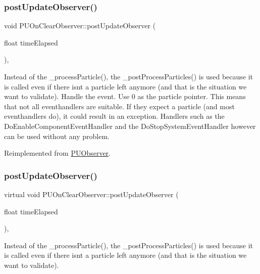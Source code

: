 \subsubsection{\texorpdfstring{post\+Update\+Observer()}{postUpdateObserver()}\hspace{0.1cm}{\footnotesize\ttfamily [1/2]}}
{\footnotesize\ttfamily void P\+U\+On\+Clear\+Observer\+::post\+Update\+Observer (\begin{DoxyParamCaption}\item[{float}]{time\+Elapsed }\end{DoxyParamCaption})\hspace{0.3cm}{\ttfamily [override]}, {\ttfamily [virtual]}}

Instead of the \+\_\+process\+Particle(), the \+\_\+post\+Process\+Particles() is used because it is called even if there isn\textquotesingle{}t a particle left anymore (and that is the situation we want to validate). Handle the event. Use 0 as the particle pointer. This means that not all eventhandlers are suitable. If they expect a particle (and most eventhandlers do), it could result in an exception. Handlers such as the Do\+Enable\+Component\+Event\+Handler and the Do\+Stop\+System\+Event\+Handler however can be used without any problem.

Reimplemented from \hyperlink{classPUObserver}{P\+U\+Observer}.

\mbox{\label{classPUOnClearObserver_a4dc534248eaa6d68828a47d4fec0f0e5}} 
\subsubsection{\texorpdfstring{post\+Update\+Observer()}{postUpdateObserver()}\hspace{0.1cm}{\footnotesize\ttfamily [2/2]}}
{\footnotesize\ttfamily virtual void P\+U\+On\+Clear\+Observer\+::post\+Update\+Observer (\begin{DoxyParamCaption}\item[{float}]{time\+Elapsed }\end{DoxyParamCaption})\hspace{0.3cm}{\ttfamily [override]}, {\ttfamily [virtual]}}

Instead of the \+\_\+process\+Particle(), the \+\_\+post\+Process\+Particles() is used because it is called even if there isn\textquotesingle{}t a particle left anymore (and that is the situation we want to validate). 

